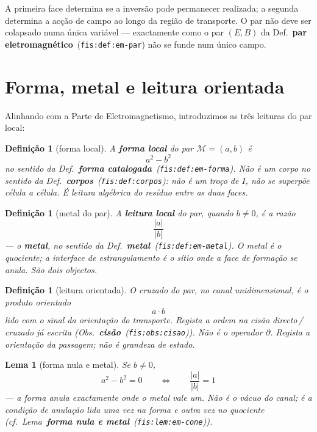 \documentclass[11pt,a4paper]{article}
\newcommand{\code}[1]{\texttt{\small #1}}
\newcommand{\fis}[2]{\textbf{#2}~\textnormal{(\code{#1})}}
\newtheorem{lema}[teorema]{Lema}
\newtheorem{definicao}[teorema]{Definição}
\begin{document}
A primeira face determina se a inversão pode permanecer realizada;
a segunda determina a acção de campo ao longo da região de transporte.
O par não deve ser colapsado numa única variável --- exactamente como
o par \((E,B)\) da Def.~\fis{fis:def:em-par}{par eletromagnético}
não se funde num único campo.


\section{Forma, metal e leitura orientada}
\label{sec:forma-metal}

Alinhando com a Parte de Eletromagnetismo, introduzimos as três leituras
do par local:

\begin{definicao}[forma local]
\label{def:forma-mosfet}
A \textbf{forma local} do par \(\mathcal M=(a,b)\) é
\[
\boxed{\;a^{2}-b^{2}\;}
\]
no sentido da Def.~\fis{fis:def:em-forma}{forma catalogada}. Não é um
corpo no sentido da Def.~\fis{fis:def:corpos}{corpos}: não é um troço
de \(I\), não se superpõe célula a célula. É leitura algébrica do
resíduo entre as duas faces.
\end{definicao}

\begin{definicao}[metal do par]
\label{def:metal-mosfet}
A \textbf{leitura local} do par, quando \(b\neq0\), é a razão
\[
\boxed{\;\frac{\lvert a\rvert}{\lvert b\rvert}\;}
\]
--- o \textbf{metal}, no sentido da Def.~\fis{fis:def:em-metal}{metal}.
O metal é o quociente; a interface de estrangulamento é o sítio onde
a face de formação se anula. São dois objectos.
\end{definicao}

\begin{definicao}[leitura orientada]
\label{def:cruzado-mosfet}
O cruzado do par, no canal unidimensional, é o produto orientado
\[
\boxed{\;a\cdot b\;}
\]
lido com o sinal da orientação do transporte. Regista a ordem na
cisão directo\,/\,cruzado já escrita (Obs.~\fis{fis:obs:cisao}{cisão}).
Não é o operador \(\partial\). \emph{Regista a orientação da passagem;
não é grandeza de estado.}
\end{definicao}

\begin{lema}[forma nula e metal]
\label{lem:forma-nula}
Se \(b\neq0\),
\[
\boxed{\;a^{2}-b^{2}=0\qquad\Longleftrightarrow\qquad\frac{\lvert a\rvert}{\lvert b\rvert}=1\;}
\]
--- a forma anula exactamente onde o metal vale um. Não é o vácuo do
canal; é a condição de anulação lida uma vez na forma e outra vez no
quociente (cf.\ Lema~\fis{fis:lem:em-cone}{forma nula e metal}).
\end{lema}
\end{document}
